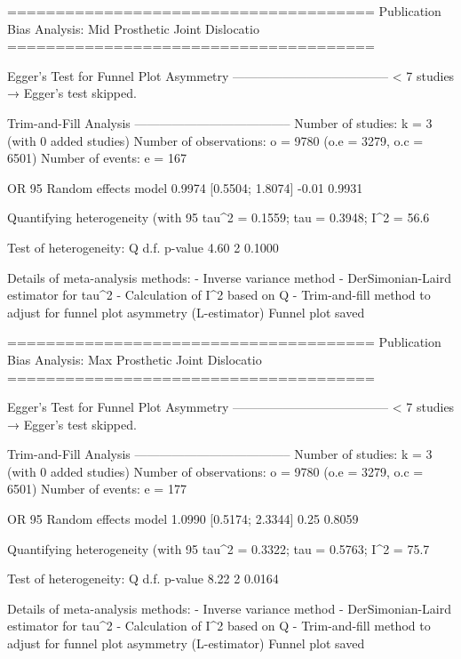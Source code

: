======================================
Publication Bias Analysis: Mid Prosthetic Joint Dislocatio 
======================================
                                                                                                                                                        
Egger's Test for Funnel Plot Asymmetry
--------------------------------------
  < 7 studies → Egger’s test skipped.

Trim-and-Fill Analysis
--------------------------------------
Number of studies: k = 3 (with 0 added studies)
Number of observations: o = 9780 (o.e = 3279, o.c = 6501)
Number of events: e = 167

                         OR           95%
Random effects model 0.9974 [0.5504; 1.8074] -0.01  0.9931

Quantifying heterogeneity (with 95%
 tau^2 = 0.1559; tau = 0.3948; I^2 = 56.6%

Test of heterogeneity:
    Q d.f. p-value
 4.60    2  0.1000

Details of meta-analysis methods:
- Inverse variance method
- DerSimonian-Laird estimator for tau^2
- Calculation of I^2 based on Q
- Trim-and-fill method to adjust for funnel plot asymmetry (L-estimator)
  Funnel plot saved

======================================
Publication Bias Analysis: Max Prosthetic Joint Dislocatio 
======================================
                                                                                                                                                        
Egger's Test for Funnel Plot Asymmetry
--------------------------------------
  < 7 studies → Egger’s test skipped.

Trim-and-Fill Analysis
--------------------------------------
Number of studies: k = 3 (with 0 added studies)
Number of observations: o = 9780 (o.e = 3279, o.c = 6501)
Number of events: e = 177

                         OR           95%
Random effects model 1.0990 [0.5174; 2.3344] 0.25  0.8059

Quantifying heterogeneity (with 95%
 tau^2 = 0.3322; tau = 0.5763; I^2 = 75.7%

Test of heterogeneity:
    Q d.f. p-value
 8.22    2  0.0164

Details of meta-analysis methods:
- Inverse variance method
- DerSimonian-Laird estimator for tau^2
- Calculation of I^2 based on Q
- Trim-and-fill method to adjust for funnel plot asymmetry (L-estimator)
  Funnel plot saved


